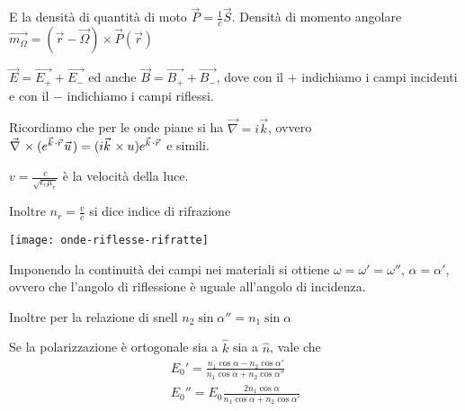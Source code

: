 \documentclass[10pt,a4paper]{article}
\begin{document}
\begin{multicols}{2}
  E la densità di quantità di moto $\vec P = \frac{1}{c} \vec S$. Densità di momento angolare $\vec{m_\Omega} = (\vec r - \vec \Omega) \times \vec{P}(\vec r)$
  
  \begin{paragrafo}
    $\vec E = \vec{E_+} + \vec{E_-}$ ed
    anche $\vec B = \vec{B_+} + \vec{B_-}$, dove con il $+$ indichiamo i
    campi incidenti e con il $-$ indichiamo i campi riflessi.
    
    
    Ricordiamo che per le onde piane si ha $\vec{\nabla} = i \vec{k}$, ovvero $\rot (e^{\vec k \cdot \vec r} \vec u) = (i \vec{k} \times u) e^{\vec k \cdot \vec r}$ e simili.
  \end{paragrafo}
  
  \begin{paragrafo}
    $v = \frac{c}{\sqrt{\epsilon_r \mu_r}}$ è la velocità della luce.
    
    Inoltre $n_r = \frac{v}{c}$ si dice indice di rifrazione
  \end{paragrafo}
  
  \begin{paragrafo}
    \begin{center}
      \texttt{[image: onde-riflesse-rifratte]}
    \end{center}
    
    Imponendo la continuità dei campi nei materiali si ottiene $\omega =
    \omega' = \omega''$, $\alpha = \alpha'$, ovvero che l'angolo di
    riflessione è uguale all'angolo di incidenza.
    
    Inoltre per la relazione di snell
    $n_2 \sin \alpha'' = n_1 \sin \alpha$
    
    Se la polarizzazione è ortogonale sia a $\hat{k}$ sia a $\hat{n}$,
    vale che
    \begin{displaymath}
      \begin{array}{c}
        E_0' = \frac{n_1 \cos \alpha - n_2 \cos \alpha'}{n_1 \cos \alpha + n_2 \cos \alpha''} \\
        E_0'' = E_0 \frac{2 n_1 \cos \alpha}{n_1 \cos \alpha + n_2 \cos \alpha'}              \\
      \end{array}
    \end{displaymath}
  \end{paragrafo}
  

\end{multicols}
\end{document}
